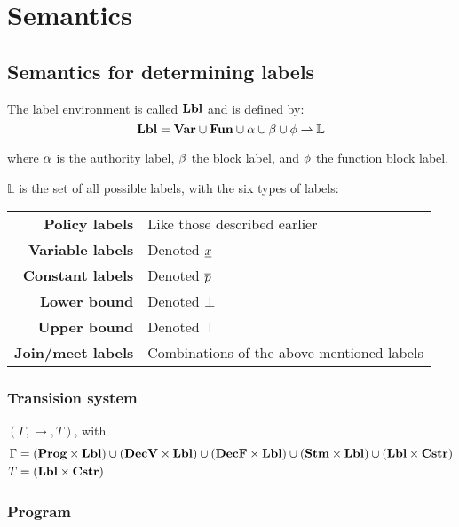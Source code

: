 \section{Semantics}

\subsection{Semantics for determining labels}
The label environment is called $\mathbf{Lbl}$ and is defined by:
\[
  \mathbf{Lbl} = \mathbf{Var} \cup \mathbf{Fun} \cup \alpha \cup \beta \cup \phi \rightharpoonup \mathbb{L}
\]

\noindent where $\alpha$ is the authority label, $\beta$ the block label, and $\phi$ the function block label.

\noindent $\mathbb{L}$ is the set of all possible labels, with the six types of labels: \\

\begin{tabular}{rl}
  \textbf{Policy labels}    & Like those described earlier \\
  \textbf{Variable labels}  & Denoted $\underline{x}$ \\
  \textbf{Constant labels}  & Denoted $\overline{p}$ \\
  \textbf{Lower bound}      & Denoted $\bot$ \\
  \textbf{Upper bound}      & Denoted $\top$ \\
  \textbf{Join/meet labels} & Combinations of the above-mentioned labels
\end{tabular}

\subsubsection{Transision system}
$(\Gamma, \rightarrow, T)$, with
\begin{align*}
  \Gamma & = (\mathbf{Prog} \times \mathbf{Lbl})
                  \cup (\mathbf{DecV} \times \mathbf{Lbl})
                  \cup (\mathbf{DecF} \times \mathbf{Lbl})
                  \cup (\mathbf{Stm} \times \mathbf{Lbl})
                  \cup (\mathbf{Lbl} \times \mathbf{Cstr}) \\
  T & = (\mathbf{Lbl} \times \mathbf{Cstr})
\end{align*}

\subsubsection{Program}

        {}
        { \quad
          }
        {}


